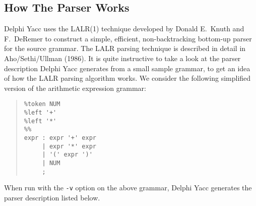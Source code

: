 \documentclass{article}
\begin{document}
\subsection{How The Parser Works}

Delphi Yacc uses the LALR(1) technique developed by Donald E.\ Knuth and F.\
DeRemer to construct a simple, efficient, non-backtracking bottom-up
parser for the source grammar. The LALR parsing technique is described
in detail in Aho/Sethi/Ullman (1986). It is quite instructive to take a
look at the parser description Delphi Yacc generates from a small sample
grammar, to get an idea of how the LALR parsing algorithm works. We
consider the following simplified version of the arithmetic expression
grammar:

\begin{quote}\begin{verbatim}
%token NUM
%left '+'
%left '*'
%%
expr : expr '+' expr
     | expr '*' expr
     | '(' expr ')'
     | NUM
     ;
\end{verbatim}\end{quote}

When run with the \verb"-v" option on the above grammar, Delphi Yacc generates
the parser description listed below.
\end{document}
